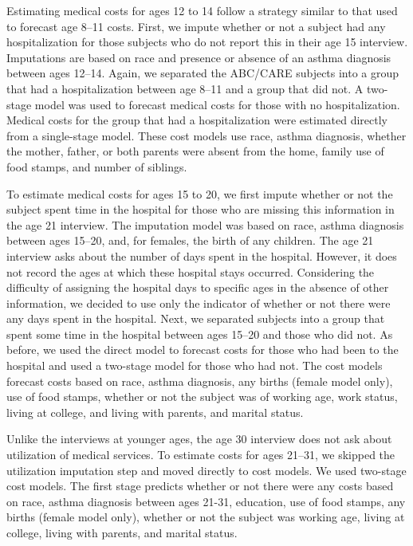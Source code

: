 \noindent Estimating medical costs for ages 12 to 14 follow a strategy similar to that used to forecast age 8--11 costs. First, we impute whether or not a subject had any hospitalization for those subjects who do not report this in their age 15 interview. Imputations are based on race and presence or absence of an asthma diagnosis between ages 12--14. Again, we separated the ABC/CARE subjects into a group that had a hospitalization between age 8--11 and a group that did not. A two-stage model was used to forecast medical costs for those with no hospitalization. Medical costs for the group that had a hospitalization were estimated directly from a single-stage model. These cost models use race, asthma diagnosis, whether the mother, father, or both parents were absent from the home, family use of food stamps, and number of siblings.

\noindent To estimate medical costs for ages 15 to 20, we first impute whether or not the subject spent time in the hospital for those who are missing this information in the age 21 interview. The imputation model was based on race, asthma diagnosis between ages 15--20, and, for females, the birth of any children. The age 21 interview asks about the number of days spent in the hospital. However, it does not record the ages at which these hospital stays occurred. Considering the difficulty of assigning the hospital days to specific ages in the absence of other information, we decided to use only the indicator of whether or not there were any days spent in the hospital. Next, we separated subjects into a group that spent some time in the hospital between ages 15--20 and those who did not. As before, we used the direct model to forecast costs for those who had been to the hospital and used a two-stage model for those who had not. The cost models forecast costs based on race, asthma diagnosis, any births (female model only), use of food stamps, whether or not the subject was of working age, work status, living at college, and living with parents, and marital status.

\noindent Unlike the interviews at younger ages, the age 30 interview does not ask about utilization of medical services. To estimate costs for ages 21--31, we skipped the utilization imputation step and moved directly to cost models. We used two-stage cost models. The first stage predicts whether or not there were any costs based on race, asthma diagnosis between ages 21-31, education, use of food stamps, any births (female model only), whether or not the subject was working age, living at college, living with parents, and marital status.

